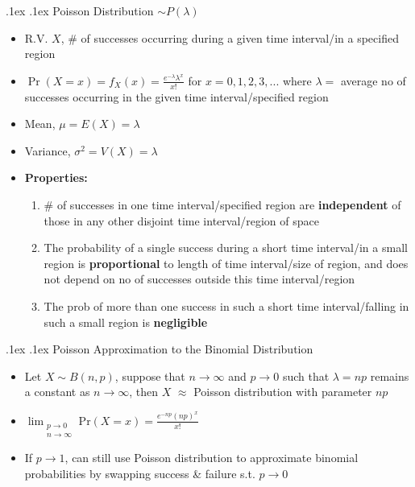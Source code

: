 \documentclass[10pt,landscape,a4paper]{article}
\makeatletter
\renewcommand{\subsection}{\@startsection{subsection}{1}{0mm}%
{.1ex}%
{.1ex}%
{\sffamily\bfseries}}
\makeatother
\begin{document}
\begin{multicols*}{4}
    \subsection{Poisson Distribution $\sim P(\lambda)$}
    \begin{itemize}
        \item R.V. $X$, \# of successes occurring during a given time interval/in a specified region
        \item $\Pr(X=x)=f_X(x)=\frac{e^{-\lambda}\lambda^x}{x!}$ for $x=0,1,2,3,...$ where $\lambda = $ average no of successes occurring in the given time interval/specified region
        \item Mean, $\mu =E(X) = \lambda$
        \item Variance, $\sigma^2 = V(X) = \lambda$
        \item \textbf{Properties:}
        \begin{enumerate}
            \item \# of successes in one time interval/specified region are \textbf{independent} of those in any other disjoint time interval/region of space
            \item The probability of a single success during a short time interval/in a small region is \textbf{proportional} to length of time interval/size of region, and does not depend on no of successes outside this time interval/region
            \item The prob of more than one success in such a short time interval/falling in such a small region is \textbf{negligible}
        \end{enumerate}
    \end{itemize}
    \subsection{Poisson Approximation to the Binomial Distribution}
    \begin{itemize}
        \item Let $X \sim B(n, p)$, suppose that $n \rightarrow \infty$ and $p \rightarrow 0$ such that $\lambda = np$ remains a constant as $n \rightarrow\infty$, then $X$ $\approx$ Poisson distribution with parameter $np$
        \item $\lim_{\substack{p\rightarrow0\\n\rightarrow\infty}}\text{Pr}(X=x)=\frac{e^{-np}(np)^x}{x!}$
        \item If $p\rightarrow 1$, can still use Poisson distribution to approximate binomial probabilities by swapping success \& failure s.t. $p \rightarrow 0$
    \end{itemize}

\end{multicols*}
\end{document}
